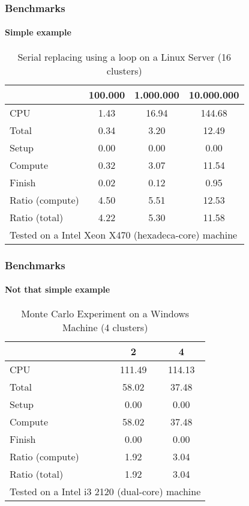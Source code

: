 \documentclass[11pt, handout]{beamer}
\def\unix1{Intel Xeon X470 (hexadeca-core)}
\def\windows1{Intel i3 2120 (dual-core)}
\begin{document}
\begin{frame}
\frametitle{Benchmarks}
\framesubtitle{Simple example}
\begin{table}[!h]
\centering
\caption{Serial replacing using a loop on a Linux Server (16 clusters)}
\begin{tabular}{l*{3}{c}}\hline
& 100.000 &         1.000.000 &       10.000.000 \\ \hline
CPU &     1.43 &     16.94 &    144.68 \\
Total &     0.34 &      3.20 &     12.49 \\
\hspace{2mm} Setup &     0.00 &      0.00 &      0.00 \\
\hspace{2mm} Compute &     0.32 &      3.07 &     11.54 \\
\hspace{2mm} Finish &     0.02 &      0.12 &      0.95 \\
\hline Ratio (compute) &     4.50 &      5.51 &     12.53 \\
Ratio (total) &     4.22 &      5.30 &     11.58 \\
\hline
\multicolumn{4}{l}{\footnotesize Tested on a \unix1 machine}
\end{tabular}
\end{table}

\end{frame}

\begin{frame}
\frametitle{Benchmarks}
\framesubtitle{Not that simple example}
\begin{table}[!h]
\centering
\caption{Monte Carlo Experiment on a Windows Machine (4 clusters)}
\begin{tabular}{l*{2}{c}}\hline
& 2 &               4 \\ \hline
CPU &   111.49 &    114.13 \\
Total &    58.02 &     37.48 \\
\hspace{2mm} Setup &     0.00 &      0.00 \\
\hspace{2mm} Compute &    58.02 &     37.48 \\
\hspace{2mm} Finish &     0.00 &      0.00 \\
\hline Ratio (compute) &     1.92 &      3.04 \\
Ratio (total) &     1.92 &      3.04 \\
\hline
\multicolumn{3}{l}{\footnotesize Tested on a \windows1 machine}
\end{tabular}
\end{table}
\end{frame}
\end{document}
